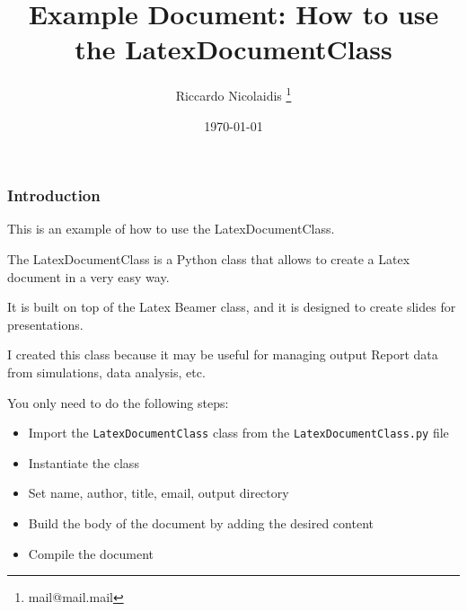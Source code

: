 \documentclass[8pt]{beamer}
\title{Example Document: How to use the LatexDocumentClass}
\author{Riccardo Nicolaidis \footnote{mail@mail.mail}}
\date{\today}
\begin{document}
        
        \begin{frame}
            \titlepage
        \end{frame}
        
        \begin{frame}
            \frametitle{Introduction}
        
This is an example of how to use the LatexDocumentClass.

The LatexDocumentClass is a Python class that allows to create a Latex document in a very easy way.

It is built on top of the Latex Beamer class, and it is designed to create slides for presentations.

I created this class because it may be useful for managing output Report data from simulations, data analysis, etc.

You only need to do the following steps:

        \begin{itemize}
        
        \item Import the \texttt{LatexDocumentClass} class from the \texttt{LatexDocumentClass.py} file
        
        \item Instantiate the class
        
        \item Set name, author, title, email, output directory
        
        \item Build the body of the document by adding the desired content
        
        \item Compile the document
        
        \end{itemize}
        
        \end{frame}
        
\end{document}
